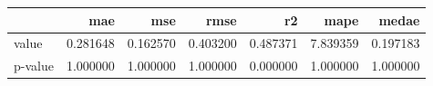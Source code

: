 \begin{tabular}{lrrrrrr}
\toprule
 & mae & mse & rmse & r2 & mape & medae \\
\midrule
value & 0.281648 & 0.162570 & 0.403200 & 0.487371 & 7.839359 & 0.197183 \\
p-value & 1.000000 & 1.000000 & 1.000000 & 0.000000 & 1.000000 & 1.000000 \\
\bottomrule
\end{tabular}
